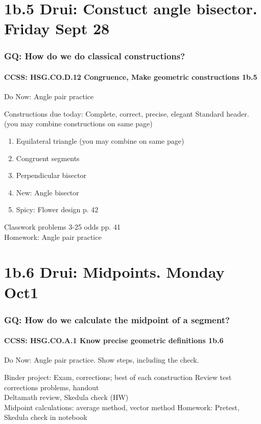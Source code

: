 \documentclass{beamer}
\begin{document}
\section{1b.5 Drui: Constuct angle bisector. Friday Sept 28}
  \frame
  {
    \frametitle{GQ: How do we do classical constructions?}
    \framesubtitle{CCSS: HSG.CO.D.12 Congruence, Make geometric constructions  \alert{1b.5}}
    Do Now: Angle pair practice
    \begin{block}{Constructions due today: Complete, correct, precise, elegant}
      Standard header. (you may combine constructions on same page)
      \begin{enumerate}
          \item Equilateral triangle (you may combine on same page)
          \item Congruent segments
          \item Perpendicular bisector
          \item New: Angle bisector
          \item Spicy: Flower design p. 42
      \end{enumerate}
    \end{block}
    Classwork problems 3-25 odds pp. 41\\
    \vspace{0.5cm}
    Homework: Angle pair practice
  }

\section{1b.6 Drui: Midpoints. Monday Oct1}
  \frame
  {
    \frametitle{GQ: How do we calculate the midpoint of a segment?}
    \framesubtitle{CCSS: HSG.CO.A.1 Know precise geometric definitions  \alert{1b.6}}

    \begin{block}{Do Now: Angle pair practice. Show steps, including the check.}
    \end{block}
    Binder project: Exam, corrections; best of each construction
    Review test corrections problems, handout\\
    Deltamath review, Skedula check (HW)\\
    Midpoint calculations: average method, vector method
    \vspace{0.5cm}
    Homework: Pretest, Skedula check in notebook
  }
\end{document}
